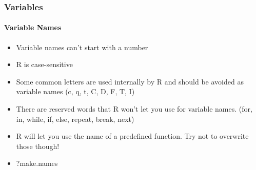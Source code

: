 \documentclass{beamer}\usepackage[]{graphicx}\usepackage[]{color}
\begin{document}


\begin{frame}[fragile]
    \frametitle{Variables}
    \framesubtitle{Variable Names}
    \begin{itemize}
        \item Variable names can't start with a number
        \item R is case-sensitive
        \item Some common letters are used internally by R and should be avoided as variable names (c, q, t, C, D, F, T, I)
        \item There are reserved words that R won't let you use for variable names. (for, in, while, if, else, repeat, break, next)
        \item R will let you use the name of a predefined function.  Try not to overwrite those though!
        \item ?make.names
    \end{itemize}
\end{frame}

\end{document}
